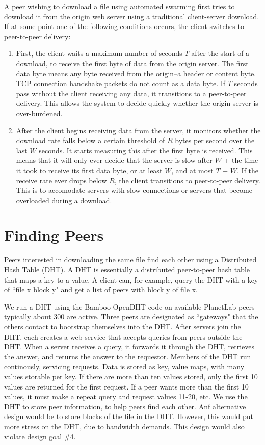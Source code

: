 A peer wishing to download a file using automated swarming first tries to download it from the origin web server using a traditional client-server download.  
If at some point one of the following conditions occurs, the client switches to peer-to-peer delivery:
\begin{enumerate}
\item First, the client waits a maximum number of seconds $T$ after the start of a download, to receive the first byte of data from the origin server.  
The first data byte means any byte received from the origin--a header or content byte.  TCP connection handshake packets do not count as a data byte.
If $T$ seconds pass without the client receiving any data, it transitions to a peer-to-peer delivery.  This allows the system to decide quickly whether the origin server is over-burdened.   
\item After the client begins receiving data from the server, it monitors whether the download rate falls below a certain 
threshold of $R$ bytes per second over the last $W$ seconds.  It starts measuring this after the first byte is received.  This means that it will
only ever decide that the server is slow after $W$ + the time it took to receive its first data byte, or at least $W$, and at most $T$ + $W$.  
If the receive rate ever drops below $R$, the client transitions to peer-to-peer delivery.  
This is to accomodate servers with slow connections or servers that become overloaded during a download.
\end{enumerate}

\section{Finding Peers}

Peers interested in downloading the same file find each other using a Distributed Hash Table (DHT).
A DHT is essentially a distributed peer-to-peer hash table that maps a key to a value.  A client can,
for example, query the DHT with a key of ``file x block y" and get a list of peers with block y
of file x.

We run a DHT using the Bamboo OpenDHT code on available PlanetLab peers--typically about 300 are active.
Three peers are designated as ``gateways" that the others contact to bootstrap themselves into the DHT.  After servers join the DHT, each 
creates a web service that accepts queries from peers outside the DHT.  When a server receives a
query, it forwards it through the DHT, retrieves the answer, and returns the answer to the requestor. 
Members of the DHT run continously, servicing requests.
Data is stored as key, value maps, with many values storable per key.  
If there are more than ten values stored, only the first 10 values are returned for the first request. 
If a peer wants more than the first 10 values, it must make a repeat query and request values 11-20, etc.  
We use the DHT to store peer information, to help peers find each other.  Anf alternative design would be to store blocks of the file in the DHT.  
However, this would put more stress on the DHT, due to bandwidth demands.  This design would also violate design goal \#4.

